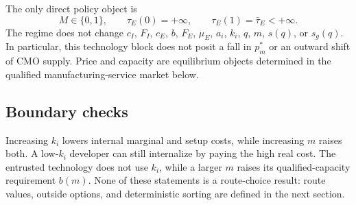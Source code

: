 The only direct policy object is
\begin{equation}
  M\in\{0,1\},
  \qquad
  \tau_E(0)=+\infty,
  \qquad
  \tau_E(1)=\bar\tau_E<+\infty.
  \label{eq:p03-policy-invariance}
\end{equation}
The regime does not change \(c_I\), \(F_I\), \(c_E\),
\(b\), \(F_E\), \(\mu_E\), \(a_i\), \(k_i\), \(q\), \(m\), \(s(q)\), or
\(s_g(q)\). In particular, this technology block does not posit a fall in
\(p_m^*\) or an outward shift of CMO supply. Price and capacity are equilibrium
objects determined in the qualified manufacturing-service market below.

\subsection{Boundary checks}
\label{subsec:p03-boundaries}

Increasing \(k_i\) lowers internal marginal and setup costs, while increasing
\(m\) raises both. A low-\(k_i\) developer can still internalize by paying the
high real cost. The entrusted technology does not use \(k_i\), while a larger
\(m\) raises its qualified-capacity requirement \(b(m)\). None of these
statements is a route-choice result: route values, outside options, and
deterministic sorting are defined in the next section.
